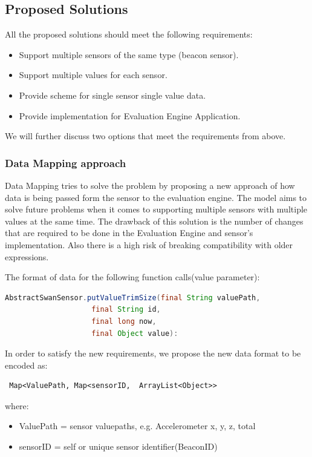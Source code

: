 \subsection{Proposed Solutions}
All the proposed solutions should meet the following requirements:
\begin{itemize}
 \item Support multiple sensors of the same type (beacon sensor).
 \item Support multiple values for each sensor.
 \item Provide scheme for single sensor single value data.
 \item Provide implementation for Evaluation Engine Application.
\end{itemize}

We will further discuss two options that meet the requirements from above.

\subsubsection{Data Mapping approach}
Data Mapping tries to solve the problem by proposing a new approach of how data is being passed form the sensor
to the evaluation engine. The model aims to solve future problems when it comes to supporting multiple sensors
with multiple values at the same time. The drawback of this solution is the number of changes that are required to be done in the
Evaluation Engine and sensor's implementation. Also there is a high risk of breaking compatibility
with older expressions.

The format of data for the following function calls(value parameter):
\begin{lstlisting}[language=Java]
 AbstractSwanSensor.putValueTrimSize(final String valuePath,
					final String id,
					final long now,
					final Object value):
\end{lstlisting}

In order to satisfy the new requirements, we propose the new data format to be encoded as: \begin{verbatim} Map<ValuePath, Map<sensorID,  ArrayList<Object>> \end{verbatim}

where:
\begin{itemize}
 \item ValuePath  = sensor valuepaths, e.g. Accelerometer x, y, z, total
 \item sensorID  =  self or unique sensor identifier(BeaconID)
\end{itemize}

